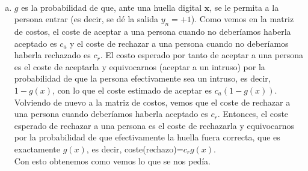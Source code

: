 \documentclass[12pt]{article}
\theoremstyle{definition}
\begin{document}
\begin{pregunta}
\textit{ }\\
\begin{enumerate}[a)]
\item $g$ es la probabilidad de que, ante una huella digital $\mathbf{x}$, se le permita a la persona entrar (es decir, se dé la salida $y_n=+1$). Como vemos en la matriz de costos, el coste de aceptar a una persona cuando no deberíamos haberla aceptado es $c_a$ y el coste de rechazar a una persona cuando no deberíamos haberla rechazado es $c_r$. El costo esperado por tanto de aceptar a una persona es el coste de aceptarla y equivocarnos (aceptar a un intruso) por la probabilidad de que la persona efectivamente sea un intruso, es decir, $1-g(x)$, con lo que el coste estimado de aceptar es $c_a(1-g(x))$.\\
Volviendo de nuevo a la matriz de costos, vemos que el coste de rechazar a una persona cuando deberíamos haberla aceptado es $c_r$. Entonces, el coste esperado de rechazar a una persona es el coste de rechazarla y equivocarnos por la probabilidad de que efectivamente la huella fuera correcta, que es exactamente $g(x)$, es decir, coste(rechazo)=$c_rg(x)$.\\
Con esto obtenemos como vemos lo que se nos pedía.

\end{enumerate}
\end{pregunta}
\end{document}
